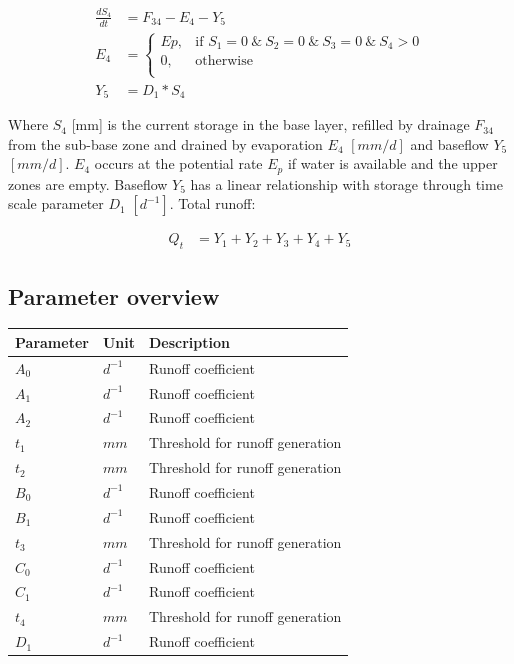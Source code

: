 \begin{align}
	\frac{dS_4}{dt} &= F_{34}-E_4-Y_5\\
	E_4 &= \begin{cases}
		Ep, &\text{if } S_1 = 0 ~\&~ S_2 = 0 ~\&~ S_3 = 0 ~\&~ S_4 > 0\\
		0, & \text{otherwise} \\
	\end{cases} \\
	Y_5 &= D_1*S_4
\end{align}

Where $S_4$ [mm] is the current storage in the base layer, refilled by drainage $F_{34}$ from the sub-base zone and drained by evaporation $E_4$ $[mm/d]$ and baseflow $Y_5$ $[mm/d]$. $E_4$ occurs at the potential rate $E_p$ if water is available and the upper zones are empty. Baseflow $Y_5$ has a linear relationship with storage through time scale parameter $D_1$ $[d^{-1}]$. Total runoff:

\begin{align}
	Q_t &= Y_1+Y_2+Y_3+Y_4+Y_5
\end{align}

\subsection{Parameter overview}
\begin{table}[htbp]
  \centering
    \begin{tabular}{lll}
    \toprule
    Parameter & Unit  & Description \\
    \midrule
    $A_0$ & $d^{-1}$ & Runoff coefficient \\
    $A_1$ & $d^{-1}$ & Runoff coefficient \\
    $A_2$ & $d^{-1}$ & Runoff coefficient \\
    $t_1$ & $mm$  & Threshold for runoff generation \\
    $t_2$ & $mm$  & Threshold for runoff generation \\
    $B_0$ & $d^{-1}$ & Runoff coefficient \\
    $B_1$ & $d^{-1}$ & Runoff coefficient \\
    $t_3$ & $mm$  & Threshold for runoff generation \\
    $C_0$ & $d^{-1}$ & Runoff coefficient \\
    $C_1$ & $d^{-1}$ & Runoff coefficient \\
    $t_4$ & $mm$  & Threshold for runoff generation \\
    $D_1$ & $d^{-1}$ & Runoff coefficient \\
    \bottomrule
    \end{tabular}%
  \label{tab:addlabel}%
\end{table}%

